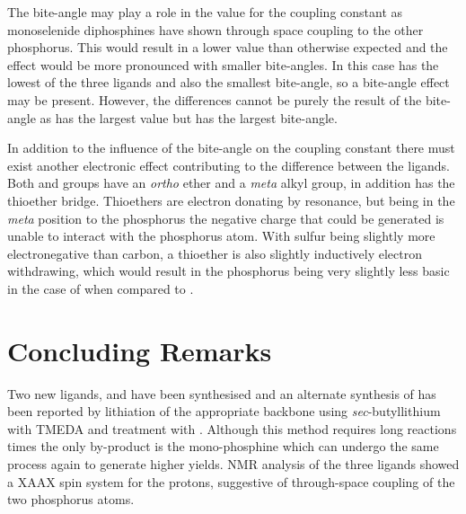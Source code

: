 The bite-angle may play a role in the value for the \JPSe{} coupling constant as monoselenide diphosphines have shown through space coupling to the other phosphorus.\cite{Hierso2014}  This would result in a lower \JPSe{} value than otherwise expected and the effect would be more pronounced with smaller bite-angles.  In this case \tBusixantphos{} has the lowest \pKb{} of the three ligands and also the smallest bite-angle, so a bite-angle effect may be present.  However, the differences cannot be purely the result of the bite-angle as \tButhixantphos{} has the largest \JPSe{} value but \tBuxantphos{} has the largest bite-angle.

In addition to the influence of the bite-angle on the \JPSe{} coupling constant there must exist another electronic effect contributing to the difference between the ligands.  Both \tButhixantphos{} and \tBuxantphos{} groups have an \emph{ortho} ether and a \emph{meta} alkyl group, in addition \tButhixantphos{} has the thioether bridge.  Thioethers are electron donating by resonance, but being in the \emph{meta} position to the phosphorus the negative charge that could be generated is unable to interact with the phosphorus atom.  With sulfur being slightly more electronegative than carbon, a thioether is also slightly inductively electron withdrawing, which would result in the phosphorus being very slightly less basic in the case of \tButhixantphos{} when compared to \tBuxantphos{}.

\section{Concluding Remarks}

Two new \tBuxantphos{} ligands, \tBusixantphos{} and \tButhixantphos{} have been synthesised and an alternate synthesis of \tBuxantphos{} has been reported by lithiation of the appropriate backbone using \emph{sec}-butyllithium with \gls{TMEDA} and treatment with .  Although this method requires long reactions times the only by-product is the mono-phosphine which can undergo the same process again to generate higher yields.  NMR analysis of the three ligands showed a XAA\textprime{}X\textprime{} spin system for the \tBu{} protons, suggestive of through-space coupling of the two phosphorus atoms.

